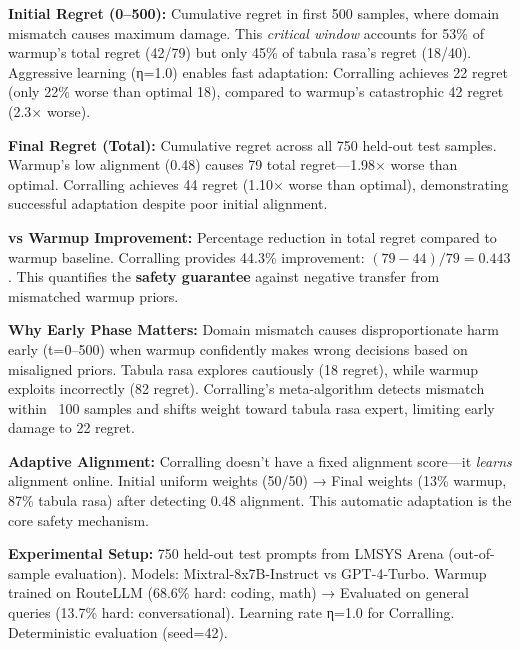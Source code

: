 \begin{table}[t]
\begin{tablenotes}
\item \textbf{Initial Regret (0--500):} Cumulative regret in first 500 samples, where domain mismatch causes maximum damage. This \emph{critical window} accounts for 53\% of warmup's total regret (42/79) but only 45\% of tabula rasa's regret (18/40). Aggressive learning (η=1.0) enables fast adaptation: Corralling achieves 22 regret (only 22\% worse than optimal 18), compared to warmup's catastrophic 42 regret (2.3× worse).

\item \textbf{Final Regret (Total):} Cumulative regret across all 750 held-out test samples. Warmup's low alignment (0.48) causes 79 total regret—1.98× worse than optimal. Corralling achieves 44 regret (1.10× worse than optimal), demonstrating successful adaptation despite poor initial alignment.

\item \textbf{vs Warmup Improvement:} Percentage reduction in total regret compared to warmup baseline. Corralling provides 44.3\% improvement: $(79-44)/79 = 0.443$. This quantifies the \textbf{safety guarantee} against negative transfer from mismatched warmup priors.

\item \textbf{Why Early Phase Matters:} Domain mismatch causes disproportionate harm early (t=0--500) when warmup confidently makes wrong decisions based on misaligned priors. Tabula rasa explores cautiously (18 regret), while warmup exploits incorrectly (82 regret). Corralling's meta-algorithm detects mismatch within ~100 samples and shifts weight toward tabula rasa expert, limiting early damage to 22 regret.

\item \textbf{Adaptive Alignment:} Corralling doesn't have a fixed alignment score—it \emph{learns} alignment online. Initial uniform weights (50/50) → Final weights (13\% warmup, 87\% tabula rasa) after detecting 0.48 alignment. This automatic adaptation is the core safety mechanism.

\item \textbf{Experimental Setup:} 750 held-out test prompts from LMSYS Arena (out-of-sample evaluation). Models: Mixtral-8x7B-Instruct vs GPT-4-Turbo. Warmup trained on RouteLLM (68.6\% hard: coding, math) → Evaluated on general queries (13.7\% hard: conversational). Learning rate η=1.0 for Corralling. Deterministic evaluation (seed=42).
\end{tablenotes}
\end{table}

